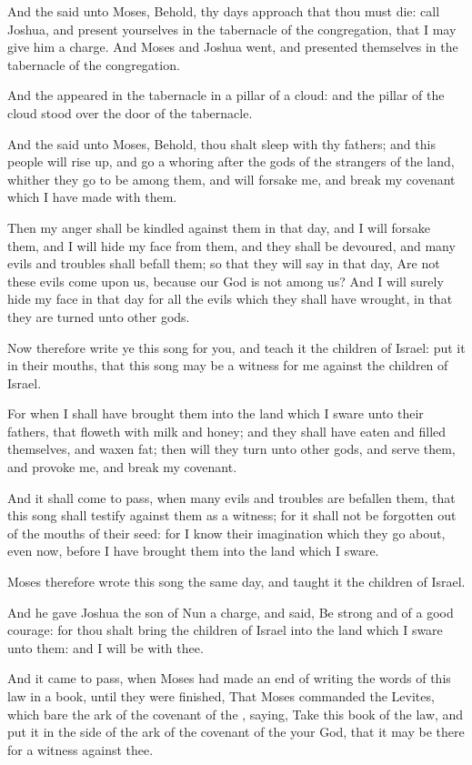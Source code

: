 \verse And the \LORD said unto Moses, Behold, thy days approach that thou must die: call Joshua, and present yourselves in the tabernacle of the congregation, that I may give him a charge. And Moses and Joshua went, and presented themselves in the tabernacle of the congregation.

\verse And the \LORD appeared in the tabernacle in a pillar of a cloud: and the pillar of the cloud stood over the door of the tabernacle.

\verse And the \LORD said unto Moses, Behold, thou shalt sleep with thy fathers; and this people will rise up, and go a whoring after the gods of the strangers of the land, whither they go to be among them, and will forsake me, and break my covenant which I have made with them.

\verse Then my anger shall be kindled against them in that day, and I will forsake them, and I will hide my face from them, and they shall be devoured, and many evils and troubles shall befall them; so that they will say in that day, Are not these evils come upon us, because our God is not among us?  \verse And I will surely hide my face in that day for all the evils which they shall have wrought, in that they are turned unto other gods.

\verse Now therefore write ye this song for you, and teach it the children of Israel: put it in their mouths, that this song may be a witness for me against the children of Israel.

\verse For when I shall have brought them into the land which I sware unto their fathers, that floweth with milk and honey; and they shall have eaten and filled themselves, and waxen fat; then will they turn unto other gods, and serve them, and provoke me, and break my covenant.

\verse And it shall come to pass, when many evils and troubles are befallen them, that this song shall testify against them as a witness; for it shall not be forgotten out of the mouths of their seed: for I know their imagination which they go about, even now, before I have brought them into the land which I sware.

\verse Moses therefore wrote this song the same day, and taught it the children of Israel.

\verse And he gave Joshua the son of Nun a charge, and said, Be strong and of a good courage: for thou shalt bring the children of Israel into the land which I sware unto them: and I will be with thee.

\verse And it came to pass, when Moses had made an end of writing the words of this law in a book, until they were finished, \verse That Moses commanded the Levites, which bare the ark of the covenant of the \LORD, saying, \verse Take this book of the law, and put it in the side of the ark of the covenant of the \LORD your God, that it may be there for a witness against thee.

